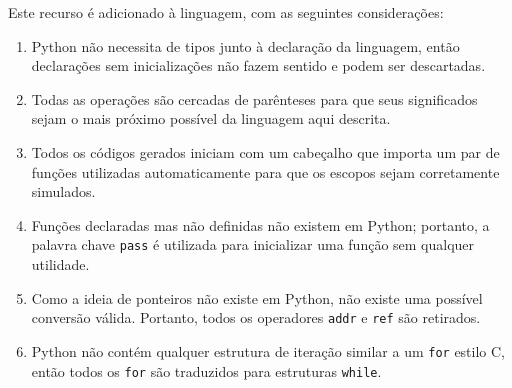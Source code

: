 \documentclass{sftex/sftex}
\newenvironment{smallenum}{
    \vspace{-1mm}
    \begin{enumerate}[label=\roman*.]
    \setlength{\parskip}{0pt}
    \setlength{\itemsep}{2pt}
}{
    \vspace{-2mm}
    \end{enumerate}
}
\begin{document}
Este recurso é adicionado à linguagem, com as seguintes considerações:

\begin{smallenum}

\item Python não necessita de tipos junto à declaração da linguagem, então
    declarações sem inicializações não fazem sentido e podem ser descartadas.

\item Todas as operações são cercadas de parênteses para que seus significados
    sejam o mais próximo possível da linguagem aqui descrita.

\item Todos os códigos gerados iniciam com um cabeçalho que importa um par
    de funções utilizadas automaticamente para que os escopos sejam
    corretamente simulados.

\item Funções declaradas mas não definidas não existem em Python; portanto,
    a palavra chave \verb!pass! é utilizada para inicializar uma função
    sem qualquer utilidade.

\item Como a ideia de ponteiros não existe em Python, não existe uma possível
	conversão válida. Portanto, todos os operadores \verb!addr! e
	\verb!ref! são retirados.

\item Python não contém qualquer estrutura de iteração similar a um
    \verb!for! estilo C, então todos os \verb!for! são traduzidos para
    estruturas \verb!while!.

\end{smallenum}
\end{document}
